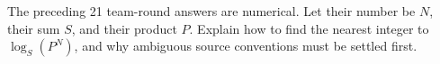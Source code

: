 The preceding 21 team-round answers are numerical. Let their number be $N$, their sum $S$, and their product $P$. Explain how to find the nearest integer to $\log_S(P^N)$, and why ambiguous source conventions must be settled first.
